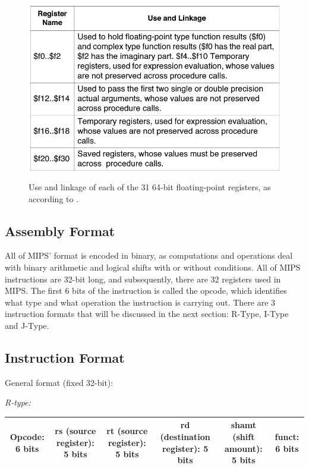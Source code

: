 \documentclass[parskip=half, fontsize=12pt]{scrartcl}
\begin{document}
\begin{figure}[H]
    \includegraphics[height=8cm]{fpr-names}
    \caption{Use and linkage of each of the 31 64-bit floating-point
    registers, as according to \protect\cite[Table~1-3]{mips-programmers-guide}.}
\end{figure}

\subsection{Assembly Format}

All of MIPS' format is encoded in binary, as computations and operations
deal with binary arithmetic and logical shifts with or without
conditions. All of MIPS instructions are 32-bit long, and subsequently,
there are 32 registers used in MIPS. The first 6 bits of the instruction
is called the opcode, which identifies what type and what operation the
instruction is carrying out. There are 3 instruction formats that will
be discussed in the next section: R-Type, I-Type and J-Type.

\subsection{Instruction Format}

General format (fixed 32-bit):

\emph{R-type:}

\begin{tabularx}{\textwidth}{@{}|C|C|C|C|C|C|@{}}
    \hline
    Opcode: 6 bits & rs (source register): 5 bits & rt (source register): 5 bits & rd (destination register): 5 bits & shamt (shift amount): 5 bits & funct: 6 bits \\
    \hline
\end{tabularx}
\end{document}
